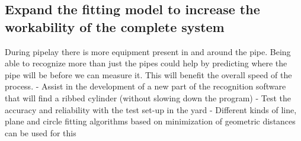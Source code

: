 \subsection{Expand the fitting model to increase the workability of the complete system}
During pipelay there is more equipment present in and around the pipe. Being able to recognize more than just the pipes could help by predicting where the pipe will be before we can measure it. This will benefit the overall speed of the process.
- Assist in the development of a new part of the recognition software that will find a ribbed cylinder (without slowing down the program)
- Test the accuracy and reliability with the test set-up in the yard
- Different kinds of line, plane and circle fitting algorithms based on minimization of geometric distances can be used for this
